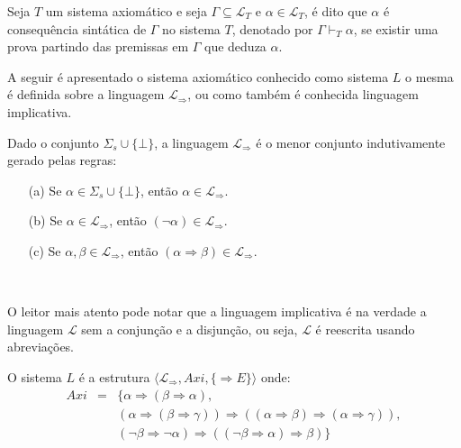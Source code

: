 \begin{definicao}\label{def:ConsequênciaAxiomatica}
  Seja $T$ um sistema axiomático e seja $\Gamma \subseteq \mathcal{L}_T$ e $\alpha \in \mathcal{L}_T$, é dito que $\alpha$ é consequência sintática de $\Gamma$ no sistema $T$, denotado por $\Gamma \vdash_T \alpha$, se existir uma prova partindo das premissas em $\Gamma$ que deduza $\alpha$.
\end{definicao}

A seguir é apresentado o sistema axiomático conhecido como sistema $L$ o mesma é definida sobre a linguagem $\mathcal{L}_\Rightarrow$, ou como também é conhecida linguagem implicativa.

\begin{definicao}\label{def:LinguagemL}
  Dado o conjunto $\Sigma_s \cup \{\bot\}$, a linguagem $\mathcal{L}_\Rightarrow$ é o menor conjunto indutivamente gerado pelas regras:
  \begin{itemize}
      \item[(a)] Se $\alpha \in \Sigma_s \cup \{\bot\}$, então $\alpha \in \mathcal{L}_\Rightarrow$.
      \item[(b)] Se $\alpha \in \mathcal{L}_\Rightarrow$, então $(\neg \alpha) \in \mathcal{L}_\Rightarrow$.
      \item[(c)] Se $\alpha, \beta \in \mathcal{L}_\Rightarrow$, então $(\alpha \Rightarrow \beta) \in \mathcal{L}_\Rightarrow$.
  \end{itemize}
\end{definicao}

\ 

O leitor mais atento pode notar que a linguagem implicativa é na verdade a linguagem $\mathcal{L}$ sem a conjunção e a disjunção, ou seja, $\mathcal{L}$ é reescrita usando abreviações.

\begin{definicao}[Sistema $L$]\label{def:SistemaL}
  \cite{mendelson2009livro} O sistema $L$ é a  estrutura $\langle \mathcal{L}_\Rightarrow, Axi, \{ \Rightarrow E\}\rangle$ onde: 
  \begin{eqnarray*}
    Axi & = & \Big\{\alpha \Rightarrow (\beta \Rightarrow \alpha),\\
    & & (\alpha \Rightarrow (\beta \Rightarrow \gamma)) \Rightarrow ((\alpha \Rightarrow \beta) \Rightarrow (\alpha \Rightarrow \gamma)),\\ 
    & & (\neg \beta \Rightarrow \neg \alpha) \Rightarrow ((\neg \beta \Rightarrow \alpha) \Rightarrow \beta)\Big\}
  \end{eqnarray*}
\end{definicao}

